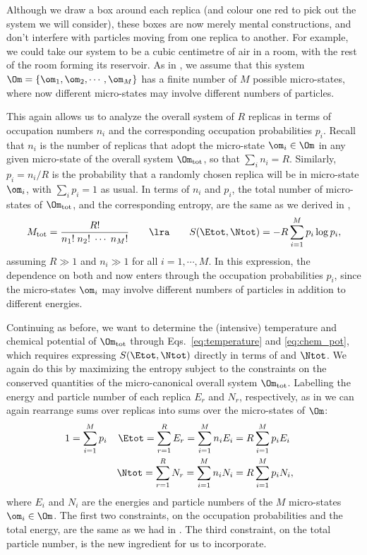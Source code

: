Although we draw a box around each replica (and colour one red to pick out the system \Om we will consider), these boxes are now merely mental constructions, and don't interfere with particles moving from one replica to another.
For example, we could take our system to be a cubic centimetre of air in a room, with the rest of the room forming its reservoir.
As in , we assume that this system $\Om = \left\{\om_1, \om_2, \cdots, \om_M\right\}$ has a finite number of $M$ possible micro-states, where now different micro-states may involve different numbers of particles.

This again allows us to analyze the overall system of $R$ replicas in terms of occupation numbers $n_i$ and the corresponding occupation probabilities $p_i$.
Recall that $n_i$ is the number of replicas that adopt the micro-state $\om_i \in \Om$ in any given micro-state of the overall system $\Om_{\text{tot}}$, so that $\sum_i n_i = R$.
Similarly, $p_i = n_i / R$ is the probability that a randomly chosen replica will be in micro-state $\om_i$, with $\sum_i p_i = 1$ as usual.
In terms of $n_i$ and $p_i$, the total number of micro-states of $\Om_{\text{tot}}$, and the corresponding entropy, are the same as we derived in ,
\begin{equation*}
  M_{\text{tot}} = \frac{R!}{n_1! \; n_2! \; \cdots \; n_M!} \qquad \lra \qquad S(\Etot, \Ntot) = -R \sum_{i = 1}^M p_i \log p_i,
\end{equation*}
assuming $R \gg 1$ and $n_i \gg 1$ for all $i = 1, \cdots, M$.
In this expression, the dependence on both \Etot and \Ntot now enters through the occupation probabilities $p_i$, since the micro-states $\om_i$ may involve different numbers of particles in addition to different energies.

Continuing as before, we want to determine the (intensive) temperature and chemical potential of $\Om_{\text{tot}}$ through Eqs.~\ref{eq:temperature} and \ref{eq:chem_pot}, which requires expressing $S(\Etot, \Ntot)$ directly in terms of \Etot and $\Ntot$.
We again do this by maximizing the entropy subject to the constraints on the conserved quantities of the micro-canonical overall system $\Om_{\text{tot}}$.
Labelling the energy and particle number of each replica $E_r$ and $N_r$, respectively, as in  we can again rearrange sums over replicas into sums over the micro-states of $\Om$:
\begin{align}
  1 & = \sum_{i = 1}^M p_i & \Etot = \sum_{r = 1}^R E_r = \sum_{i = 1}^M n_i E_i & = R \sum_{i = 1}^M p_i E_i \cr
    &                      & \Ntot = \sum_{r = 1}^R N_r = \sum_{i = 1}^M n_i N_i & = R \sum_{i = 1}^M p_i N_i, \label{eq:grand_constraint}
\end{align}
where $E_i$ and $N_i$ are the energies and particle numbers of the $M$ micro-states $\om_i \in \Om$.
The first two constraints, on the occupation probabilities and the total energy, are the same as we had in .
The third constraint, on the total particle number, is the new ingredient for us to incorporate.

